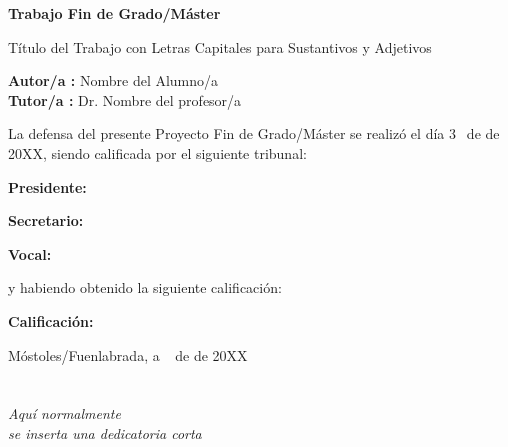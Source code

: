 \documentclass[a4paper, 12pt]{book}
\begin{document}
\vspace{-4cm}
\begin{center}
\LARGE
\textbf{Trabajo Fin de Grado/Máster}

\vspace{1cm}
\large
Título del Trabajo con Letras Capitales para Sustantivos y Adjetivos

\vspace{1cm}
\large
\textbf{Autor/a :} Nombre del Alumno/a  \\
\textbf{Tutor/a :} Dr. Nombre del profesor/a

\end{center}

\vspace{1cm}
La defensa del presente Proyecto Fin de Grado/Máster se realizó el día 3\qquad$\;\,$ de
\qquad\qquad\qquad\qquad \newline de 20XX, siendo calificada por el siguiente tribunal:


\vspace{0.5cm}
\textbf{Presidente:}

\vspace{0.8cm}
\textbf{Secretario:}

\vspace{0.8cm}
\textbf{Vocal:}


\vspace{0.8cm}
y habiendo obtenido la siguiente calificación:

\vspace{0.8cm}
\textbf{Calificación:}


\vspace{0.8cm}
\begin{flushright}
Móstoles/Fuenlabrada, a \qquad$\;\,$ de \qquad\qquad\qquad\qquad de 20XX
\end{flushright}


\chapter*{}
\begin{flushright}
\textit{Aquí normalmente \\
se inserta una dedicatoria corta \\}
\end{flushright}

\end{document}
